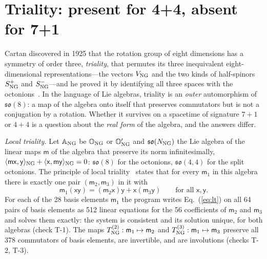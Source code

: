 \section{Triality: present for 4+4, absent for 7+1}
\label{sec:triality}

Cartan discovered in 1925 that the rotation group of eight dimensions has a symmetry of order three,
\emph{triality}, that permutes its three inequivalent eight-dimensional representations---the vectors
$V_{\rm NG}$ and the two kinds of half-spinors $S^+_{\rm NG}$ and $S^-_{\rm NG}$---and he proved it by identifying all three
spaces with the octonions~\cite{Cartan1925,Baez2002}. In the language of Lie algebras, triality is an
\emph{outer} automorphism of $\mathfrak{so}(8)$: a map of the algebra onto itself that preserves
commutators but is not a conjugation by a rotation. Whether it survives on a spacetime of signature
$7+1$ or $4+4$ is a question about the \emph{real form} of the algebra, and the answers differ.

\emph{Local triality.} Let $\mathbb A_{\rm NG}$ be $\mathbb O_{\rm NG}$ or $\mathbb O'_{\rm NG}$ and
$\mathfrak{so}(N_{\rm NG})$ the Lie algebra of the linear maps $\mathsf m$ of the algebra that preserve its
norm infinitesimally, $\langle\mathsf m\mathsf x,\mathsf y\rangle_{\rm NG}+\langle\mathsf x,\mathsf m\mathsf y\rangle_{\rm NG}=0$:
$\mathfrak{so}(8)$ for the octonions, $\mathfrak{so}(4,4)$ for the split octonions. The principle of local
triality~\cite{Schafer1966} states that for every $\mathsf m_1$ in this algebra there is exactly one pair
$(\mathsf m_2,\mathsf m_3)$ in it with
\begin{equation}
\mathsf m_1(\mathsf x\mathsf y)=(\mathsf m_2\mathsf x)\mathsf y+\mathsf x(\mathsf m_3\mathsf y)\qquad\text{for all }\mathsf x,\mathsf y.
\label{eq:lt}
\end{equation}
For each of the 28 basis elements $\mathsf m_1$ the program writes Eq.~(\ref{eq:lt}) on all 64 pairs of
basis elements as 512 linear equations for the 56 coefficients of $\mathsf m_2$ and $\mathsf m_3$ and solves
them exactly: the system is consistent and its solution unique, for both algebras (check T-1). The
maps $T^{(2)}_{\rm NG}:\mathsf m_1\mapsto\mathsf m_2$ and $T^{(3)}_{\rm NG}:\mathsf m_1\mapsto\mathsf m_3$ preserve all
378 commutators of basis elements, are invertible, and are involutions (checks T-2, T-3).

